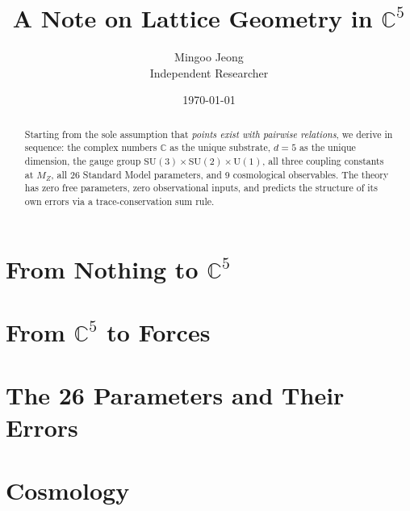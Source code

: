 \documentclass[12pt]{article}
\title{A Note on Lattice Geometry in $\mathbb{C}^5$}
\author{Mingoo Jeong\\Independent Researcher}
\date{\today}
\theoremstyle{remark}
\theoremstyle{definition}
\begin{document}
\maketitle

\begin{abstract}
Starting from the sole assumption that \emph{points exist with pairwise relations}, we derive in sequence: the complex numbers $\mathbb{C}$ as the unique substrate, $d = 5$ as the unique dimension, the gauge group $\text{SU}(3)\times\text{SU}(2)\times\text{U}(1)$, all three coupling constants at $M_Z$, all 26 Standard Model parameters, and 9 cosmological observables. The theory has zero free parameters, zero observational inputs, and predicts the structure of its own errors via a trace-conservation sum rule.
\end{abstract}

\tableofcontents
\newpage

\part{From Nothing to $\mathbb{C}^5$}




\part{From $\mathbb{C}^5$ to Forces}





\part{The 26 Parameters and Their Errors}





\part{Cosmology}
\end{document}
